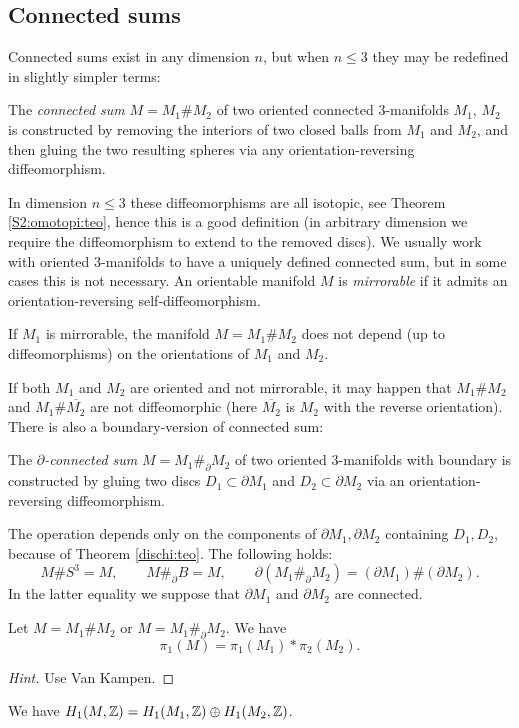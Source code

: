 \subsection{Connected sums}
Connected sums exist in any dimension $n$, but when $n\leqslant 3$ they may be redefined in slightly simpler terms: 
\begin{defn}
The \emph{connected sum} $M=M_1\#M_2$ of two oriented connected $3$-manifolds $M_1$, $M_2$ is constructed by removing the interiors of two closed balls from $M_1$ and $M_2$, and then gluing the two resulting spheres via any orientation-reversing diffeomorphism. 
\end{defn}
In dimension $n\leqslant 3$ these diffeomorphisms are all isotopic, see Theorem \ref{S2:omotopi:teo},
 hence this is a good definition (in arbitrary dimension we require the diffeomorphism to extend to the removed discs). We usually work with oriented 3-manifolds to have a uniquely defined connected sum, but in some cases this is not necessary. An orientable manifold $M$ is \emph{mirrorable} if it admits an orientation-reversing self-diffeomorphism.

\begin{ex} If $M_1$ is mirrorable, the manifold $M = M_1\# M_2$ does not depend (up to diffeomorphisms) on the orientations of $M_1$ and $M_2$.
\end{ex}

If both $M_1$ and $M_2$ are oriented and not mirrorable, it may happen that $M_1\# M_2$ and $M_1 \# \overline{M_2}$ are not diffeomorphic (here $\overline{M_2}$ is $M_2$ with the reverse orientation).
There is also a boundary-version of connected sum:

\begin{defn}
The \emph{$\partial$-connected sum} $M=M_1\#_\partial M_2$ of two oriented $3$-manifolds with boundary is constructed by gluing two discs $D_1\subset \partial M_1$ and $D_2\subset \partial M_2$ via an orientation-reversing diffeomorphism.
\end{defn}

The operation depends only on the components of $\partial M_1, \partial M_2$ containing $D_1, D_2$, because of Theorem \ref{dischi:teo}. The following holds:
$$M\# S^3 = M, \qquad M\#_\partial B = M, \qquad \partial (M_1\#_\partial M_2) = (\partial M_1)\#(\partial M_2).$$
In the latter equality we suppose that $\partial M_1$ and $\partial M_2$ are connected.

\begin{ex} Let $M = M_1\# M_2$ or $M=M_1\#_\partial M_2$. We have
$$\pi_1(M) = \pi_1(M_1) * \pi_2(M_2).$$
\end{ex}
\begin{proof}[Hint]
Use Van Kampen. 
\end{proof}
\begin{cor}
We have $H_1(M,\mathbb{Z}) = H_1(M_1,\mathbb{Z}) \oplus H_1(M_2,\mathbb{Z})$.
\end{cor}

